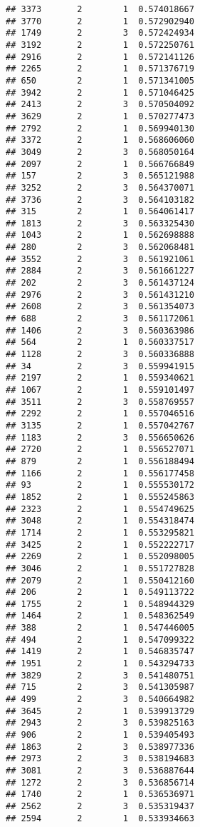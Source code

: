 \documentclass[
]{article}
\begin{document}
\begin{verbatim}
## 3373       2        1  0.574018667
## 3770       2        1  0.572902940
## 1749       2        3  0.572424934
## 3192       2        1  0.572250761
## 2916       2        1  0.572141126
## 2265       2        1  0.571376719
## 650        2        1  0.571341005
## 3942       2        1  0.571046425
## 2413       2        3  0.570504092
## 3629       2        1  0.570277473
## 2792       2        1  0.569940130
## 3372       2        1  0.568606060
## 3049       2        3  0.568050164
## 2097       2        1  0.566766849
## 157        2        3  0.565121988
## 3252       2        3  0.564370071
## 3736       2        3  0.564103182
## 315        2        1  0.564061417
## 1813       2        3  0.563325430
## 1043       2        1  0.562698888
## 280        2        3  0.562068481
## 3552       2        3  0.561921061
## 2884       2        3  0.561661227
## 202        2        3  0.561437124
## 2976       2        3  0.561431210
## 2608       2        3  0.561354073
## 688        2        3  0.561172061
## 1406       2        3  0.560363986
## 564        2        1  0.560337517
## 1128       2        3  0.560336888
## 34         2        3  0.559941915
## 2197       2        1  0.559340621
## 1067       2        1  0.559101497
## 3511       2        3  0.558769557
## 2292       2        1  0.557046516
## 3135       2        1  0.557042767
## 1183       2        3  0.556650626
## 2720       2        1  0.556527071
## 879        2        1  0.556188494
## 1166       2        1  0.556177458
## 93         2        1  0.555530172
## 1852       2        1  0.555245863
## 2323       2        1  0.554749625
## 3048       2        1  0.554318474
## 1714       2        1  0.553295821
## 3425       2        1  0.552222717
## 2269       2        1  0.552098005
## 3046       2        1  0.551727828
## 2079       2        1  0.550412160
## 206        2        1  0.549113722
## 1755       2        1  0.548944329
## 1464       2        1  0.548362549
## 388        2        1  0.547446005
## 494        2        1  0.547099322
## 1419       2        1  0.546835747
## 1951       2        1  0.543294733
## 3829       2        3  0.541480751
## 715        2        3  0.541305987
## 499        2        3  0.540664982
## 3645       2        1  0.539913729
## 2943       2        3  0.539825163
## 906        2        1  0.539405493
## 1863       2        3  0.538977336
## 2973       2        3  0.538194683
## 3081       2        3  0.536887644
## 1272       2        3  0.536856714
## 1740       2        1  0.536536971
## 2562       2        3  0.535319437
## 2594       2        1  0.533934663

\end{verbatim}
\end{document}
